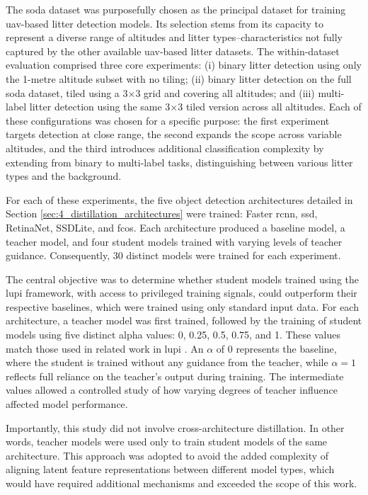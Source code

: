 The \gls{soda} dataset was purposefully chosen as the principal dataset for training \gls{uav}-based litter detection models. Its selection stems from its capacity to represent a diverse range of altitudes and litter types--characteristics not fully captured by the other available \gls{uav}-based litter datasets. The within-dataset evaluation comprised three core experiments: (i) binary litter detection using only the 1-metre altitude subset with no tiling; (ii) binary litter detection on the full \gls{soda} dataset, tiled using a 3$\times$3 grid and covering all altitudes; and (iii) multi-label litter detection using the same 3$\times$3 tiled version across all altitudes. Each of these configurations was chosen for a specific purpose: the first experiment targets detection at close range, the second expands the scope across variable altitudes, and the third introduces additional classification complexity by extending from binary to multi-label tasks, distinguishing between various litter types and the background.

For each of these experiments, the five object detection architectures detailed in Section \ref{sec:4_distillation_architectures} were trained: Faster \gls{rcnn}, \gls{ssd}, RetinaNet, SSDLite, and \gls{fcos}. Each architecture produced a baseline model, a teacher model, and four student models trained with varying levels of teacher guidance. Consequently, 30 distinct models were trained for each experiment.

The central objective was to determine whether student models trained using the \gls{lupi} framework, with access to privileged training signals, could outperform their respective baselines, which were trained using only standard input data. For each architecture, a teacher model was first trained, followed by the training of student models using five distinct \gls{alpha} values: 0, 0.25, 0.5, 0.75, and 1. These values match those used in related work in \gls{lupi} \cite{lab2wild}. An $\alpha$ of 0 represents the baseline, where the student is trained without any guidance from the teacher, while $\alpha = 1$ reflects full reliance on the teacher’s output during training. The intermediate values allowed a controlled study of how varying degrees of teacher influence affected model performance.


Importantly, this study did not involve cross-architecture distillation. In other words, teacher models were used only to train student models of the same architecture. This approach was adopted to avoid the added complexity of aligning latent feature representations between different model types, which would have required additional mechanisms and exceeded the scope of this work.

